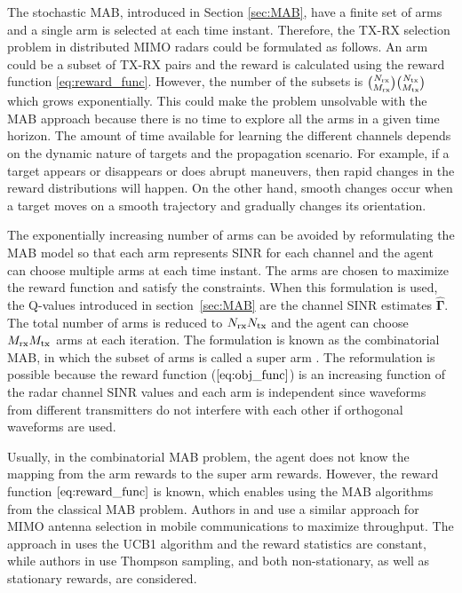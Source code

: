 \documentclass[english, 12pt, a4paper, elec, utf8, a-1b, online]{aaltothesis}
\newcommand{\vsinrb}{\widehat{\boldsymbol{\Gamma}}}
\begin{document}
The stochastic MAB, introduced in Section \ref{sec:MAB}, have a finite set of arms and a single arm is selected at each time instant.
Therefore, the TX-RX selection problem in distributed MIMO radars could be formulated as follows.
An arm could be a subset of TX-RX pairs and the reward is calculated using the reward function \eqref{eq:reward_func}.
However, the number of the subsets is $\binom{{N_{\text{rx}}}}{{M_{\text{rx}}}}\binom{{N_{\text{tx}}}}{{M_{\text{tx}}}}$ which grows exponentially. This could make the problem unsolvable with the MAB approach because there is no time to explore all the arms in a given time horizon.
The amount of time available for learning the different channels depends on the dynamic nature of targets and the propagation scenario.
For example, if a target appears or disappears or does abrupt maneuvers, then rapid changes in the reward distributions will happen. 
On the other hand, smooth changes occur when a target moves on a smooth trajectory and gradually changes its orientation.

The exponentially increasing number of arms can be avoided by reformulating the MAB model so that each arm represents SINR for each channel and the agent can choose multiple arms at each time instant.
The arms are chosen to maximize the reward function and satisfy the constraints.
When this formulation is used, the Q-values introduced in section~\ref{sec:MAB} are the channel SINR estimates $\vsinrb$.
The total number of arms is reduced to ${N_{\text{rx}}}{N_{\text{tx}}}$ and the agent can choose ${M_{\text{rx}}}{M_{\text{tx}}}$ arms at each iteration.
The formulation is known as the combinatorial MAB, in which the subset of arms is called a super arm \cite{Chen2014}.
The reformulation is possible because the reward function ($\ref{eq:obj_func}$) is an increasing function of the radar channel SINR values and each arm is independent since waveforms from different transmitters do not interfere with each other if orthogonal waveforms are used.

Usually, in the combinatorial MAB problem, the agent does not know the mapping from the arm rewards to the super arm rewards.
However, the reward function $\eqref{eq:reward_func}$ is known, which enables using the MAB algorithms from the classical MAB problem.
Authors in \cite{Mukherjee2012} and \cite{Kuai2019} use a similar approach for MIMO antenna selection in mobile communications to maximize throughput.
The approach in \cite{Mukherjee2012} uses the UCB1 algorithm and the reward statistics are constant, while authors in \cite{Kuai2019} use Thompson sampling, and both non-stationary, as well as stationary rewards, are considered.
\end{document}
